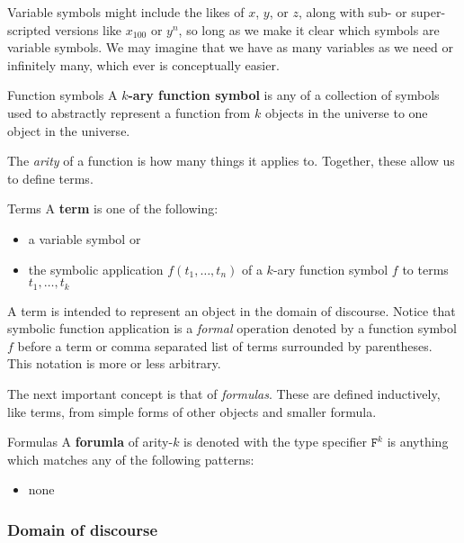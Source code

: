 \documentclass[10pt]{article}
\newcommand{\type}[1]{\texttt{#1}}
\begin{document}
	\noindent 
	Variable symbols might include the likes of $x$, $y$, or $z$, along with sub- or super-scripted versions like $x_{100}$ or $y^n$, so long as we make it clear which symbols are variable symbols.
	We may imagine that we have as many variables as we need or infinitely many, which ever is conceptually easier.
	
	\begin{definition}{Function symbols}{}
		A {\bf $k$-ary function symbol} is any of a collection of symbols used to abstractly represent a function from $k$ objects in the universe to one object in the universe.
	\end{definition}

	\noindent
	The \emph{arity} of a function is how many things it applies to.
	Together, these allow us to define terms.
	
	\begin{definition}{Terms}{}
		A {\bf term} is one of the following:
		\begin{itemize}[noitemsep,topsep=0pt]
			\item a variable symbol or
			\item the symbolic application $f(t_1,\ldots,t_n)$ of a $k$-ary function symbol $f$ to terms $t_1,\ldots,t_k$
		\end{itemize}
	\end{definition}

	\noindent
	A term is intended to represent an object in the domain of discourse.
	Notice that symbolic function application is a \emph{formal} operation denoted by a function symbol $f$ before a term or comma separated list of terms surrounded by parentheses.
	This notation is more or less arbitrary.
	
	The next important concept is that of \emph{formulas}.
	These are defined inductively, like terms, from simple forms of other objects and smaller formula.
	
	\begin{definition}{Formulas}{}
		A {\bf forumla} of arity-$k$ is denoted with the type specifier $\type{F}^k$ is anything which matches any of the following patterns:
		\begin{itemize}[itemsep=0pt]
			\item none
		\end{itemize}
	\end{definition}
	
	\subsubsection{Domain of discourse}
	
\end{document}
